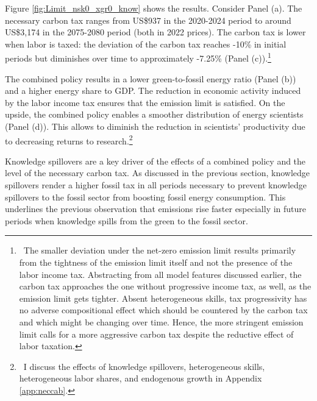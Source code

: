 \begin{figure}[h!!]
\begin{subfigure}[]{1\textwidth}
\begin{subfigure}[]{0.4\textwidth}
\end{subfigure}		
\end{subfigure}			
 \end{figure} 
 
 
Figure \ref{fig:Limit_nsk0_xgr0_know} shows the results.
Consider Panel (a). The necessary carbon tax ranges from US\$937  in the 2020-2024 period to around US\$3,174 in the 2075-2080 period (both in 2022 prices). The carbon tax is lower when labor is taxed: the deviation of the carbon tax reaches -10\% in initial periods but diminishes over time to approximately -7.25\% (Panel (c)).\footnote{\ The smaller deviation under the net-zero emission limit results primarily from the tightness of the emission limit itself and not the presence of the labor income tax. Abstracting from all model features discussed earlier, the carbon tax approaches the one without progressive income tax, as well, as the emission limit gets tighter. Absent heterogeneous skills, tax progressivity has no adverse compositional effect which should be countered by the carbon tax and which might be changing over time. Hence, the more stringent emission limit calls for a more aggressive carbon tax despite the reductive effect of labor taxation.}

The combined policy results in a lower green-to-fossil energy ratio (Panel (b)) and a higher energy share to GDP. The reduction in economic activity induced by the labor income tax ensures that the emission limit is satisfied. On the upside, the combined policy enables a smoother distribution of energy scientists (Panel (d)). This allows to diminish the reduction in scientists' productivity due to decreasing returns to research.\footnote{\ I discuss the effects of knowledge spillovers, heterogeneous skills, heterogeneous labor shares, and endogenous growth in Appendix \ref{app:neccab}. }


Knowledge spillovers are a key driver of the effects of a combined policy and the level of the necessary carbon tax.
As discussed in the previous section, knowledge spillovers render a higher fossil tax in all periods necessary to prevent knowledge spillovers to the fossil  sector from boosting fossil energy consumption.
This underlines the previous observation that emissions rise faster especially in future periods when knowledge spills from the green to the fossil sector. 

